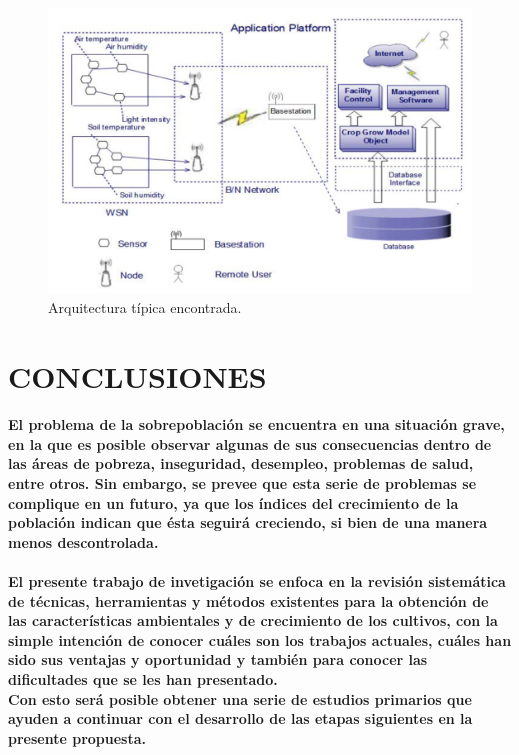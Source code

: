 \documentclass[10pt, twocolumn]{article}
\begin{document}
\begin{figure}[!ht]
	\centering
	\includegraphics[scale=0.4]{common_architecture.png}
	\caption{Arquitectura típica encontrada.}
\end{figure}

\section{CONCLUSIONES}
\paragraph{El problema de la sobrepoblación se encuentra en una situación grave, en la que es posible observar algunas de sus consecuencias dentro de las áreas de pobreza, inseguridad, desempleo, problemas de salud, entre otros. Sin embargo, se prevee que esta serie de problemas se complique en un futuro, ya que los índices del crecimiento de la población indican que ésta seguirá creciendo, si bien de una manera menos descontrolada.}
\paragraph{El presente trabajo de invetigación se enfoca en la revisión sistemática de técnicas, herramientas y métodos existentes para la obtención de las características ambientales y de crecimiento de los cultivos, con la simple intención de conocer cuáles son los trabajos actuales, cuáles han sido sus ventajas y oportunidad y también para conocer las dificultades que se les han presentado. \\ Con esto será posible obtener una serie de estudios primarios que ayuden a continuar con el desarrollo de las etapas siguientes en la presente propuesta.}
\end{document}
